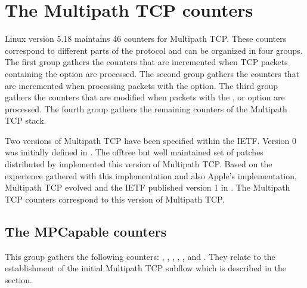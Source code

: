 \documentclass[letterpaper,10pt,english]{sphinxmanual}
\begin{document}
\chapter{The Multipath TCP counters}
\label{\detokenize{nstat-mptcp:the-multipath-tcp-counters}}\label{\detokenize{nstat-mptcp::doc}}
\sphinxAtStartPar
Linux version 5.18 maintains 46 counters for Multipath TCP. These counters
correspond to different parts of the protocol and can be organized in four
groups. The first group gathers the counters that are incremented when TCP
packets containing the  option are processed. The second group
gathers the counters that are incremented when processing packets with
the  option. The third group gathers the counters that are
modified when packets with the ,  or  option
are processed. The fourth group gathers the remaining counters of the
Multipath TCP stack.

\sphinxAtStartPar
Two versions of Multipath TCP have been specified within the IETF. Version
0 was initially defined in . The off\sphinxhyphen{}tree but well
maintained set of patches distributed by
 implemented
this version of Multipath TCP. Based on the experience gathered with this
implementation and also Apple’s implementation, Multipath TCP evolved and
the IETF published version 1 in . The Multipath TCP counters
correspond to this version of Multipath TCP.


\section{The MPCapable counters}
\label{\detokenize{nstat-mptcp:the-mpcapable-counters}}
\sphinxAtStartPar
This group gathers the following counters: ,
, ,
, ,
 and . They
relate to the establishment of the initial Multipath TCP subflow
which is described in the {\hyperref[\detokenize{mptcp:mptcp-initial-mptcp-handshake}]{}} section.
\end{document}
